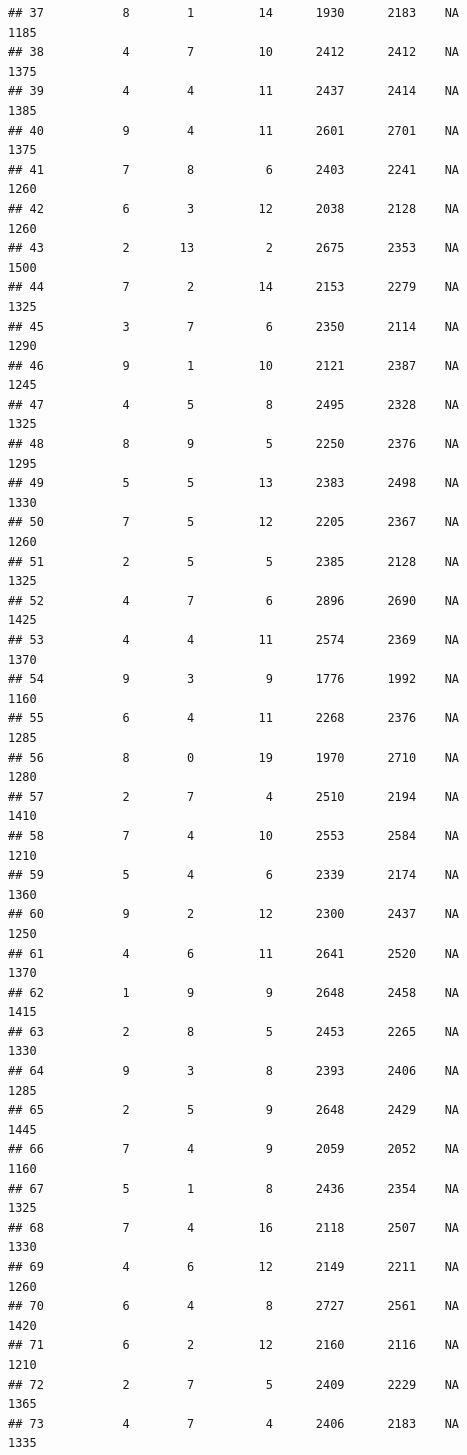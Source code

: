 \documentclass[]{book}
\begin{document}
\begin{verbatim}
## 37           8        1         14      1930      2183    NA    1185
## 38           4        7         10      2412      2412    NA    1375
## 39           4        4         11      2437      2414    NA    1385
## 40           9        4         11      2601      2701    NA    1375
## 41           7        8          6      2403      2241    NA    1260
## 42           6        3         12      2038      2128    NA    1260
## 43           2       13          2      2675      2353    NA    1500
## 44           7        2         14      2153      2279    NA    1325
## 45           3        7          6      2350      2114    NA    1290
## 46           9        1         10      2121      2387    NA    1245
## 47           4        5          8      2495      2328    NA    1325
## 48           8        9          5      2250      2376    NA    1295
## 49           5        5         13      2383      2498    NA    1330
## 50           7        5         12      2205      2367    NA    1260
## 51           2        5          5      2385      2128    NA    1325
## 52           4        7          6      2896      2690    NA    1425
## 53           4        4         11      2574      2369    NA    1370
## 54           9        3          9      1776      1992    NA    1160
## 55           6        4         11      2268      2376    NA    1285
## 56           8        0         19      1970      2710    NA    1280
## 57           2        7          4      2510      2194    NA    1410
## 58           7        4         10      2553      2584    NA    1210
## 59           5        4          6      2339      2174    NA    1360
## 60           9        2         12      2300      2437    NA    1250
## 61           4        6         11      2641      2520    NA    1370
## 62           1        9          9      2648      2458    NA    1415
## 63           2        8          5      2453      2265    NA    1330
## 64           9        3          8      2393      2406    NA    1285
## 65           2        5          9      2648      2429    NA    1445
## 66           7        4          9      2059      2052    NA    1160
## 67           5        1          8      2436      2354    NA    1325
## 68           7        4         16      2118      2507    NA    1330
## 69           4        6         12      2149      2211    NA    1260
## 70           6        4          8      2727      2561    NA    1420
## 71           6        2         12      2160      2116    NA    1210
## 72           2        7          5      2409      2229    NA    1365
## 73           4        7          4      2406      2183    NA    1335

\end{verbatim}
\end{document}

